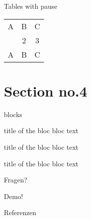   \begin{frame}{Tables with pause}
    \begin{tabular}{c c c}
      A & B & C \\
    \pause
      1 & 2 & 3 \\
    \pause
      A & B & C \\
    \end{tabular}
  \end{frame}


\section{Section no.4}
  \begin{frame}{blocks}
    \begin{block}{title of the bloc}
      bloc text
    \end{block}
    \begin{exampleblock}{title of the bloc}
      bloc text
    \end{exampleblock}
    \begin{alertblock}{title of the bloc}
      bloc text
    \end{alertblock}
  \end{frame}


  \begin{frame}[standout]
    Fragen?
  \end{frame}

  \begin{frame}[standout]
    Demo!
  \end{frame}

  \appendix

  \begin{frame}[allowframebreaks]{Referenzen}
  \end{frame}


